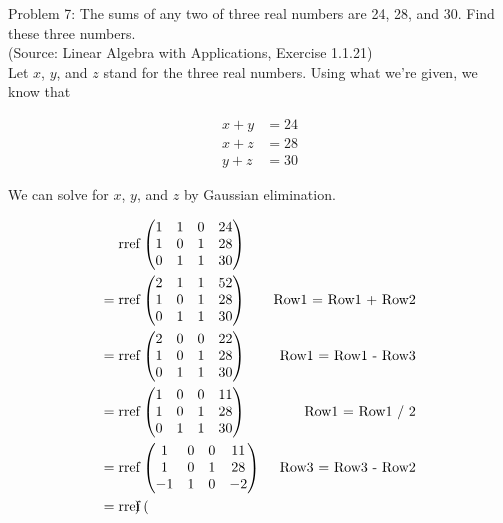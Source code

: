 \documentclass{article}
\begin{document}
Problem 7: The sums of any two of three real numbers are 24, 28, and 30. Find these three numbers. \\

(Source: Linear Algebra with Applications, Exercise 1.1.21) \\

Let $x$, $y$, and $z$ stand for the three real numbers. Using what we're given, we know that

\begin{align*}
x + y &= 24 \\
x + z &= 28 \\
y + z &= 30
\end{align*}

We can solve for $x$, $y$, and $z$ by Gaussian elimination.

\begin{align*}
\mathop{\rm rref} & \begin{pmatrix}
1 & 1 & 0 & 24 \\
1 & 0 & 1 & 28 \\
0 & 1 & 1 & 30
\end{pmatrix} \\
= \mathop{\rm rref} & \begin{pmatrix}
2 & 1 & 1 & 52 \\
1 & 0 & 1 & 28 \\
0 & 1 & 1 & 30
\end{pmatrix} & \text{Row1 = Row1 + Row2} \\
= \mathop{\rm rref} & \begin{pmatrix}
2 & 0 & 0 & 22 \\
1 & 0 & 1 & 28 \\
0 & 1 & 1 & 30
\end{pmatrix} & \text{Row1 = Row1 - Row3} \\
= \mathop{\rm rref} & \begin{pmatrix}
1 & 0 & 0 & 11 \\
1 & 0 & 1 & 28 \\
0 & 1 & 1 & 30
\end{pmatrix} & \text{Row1 = Row1 / 2} \\
= \mathop{\rm rref} & \begin{pmatrix}
1 & 0 & 0 & 11 \\
1 & 0 & 1 & 28 \\
-1 & 1 & 0 & -2
\end{pmatrix} & \text{Row3 = Row3 - Row2} \\
= \mathop{\rm rref} & \begin{pmatrix}

\end{pmatrix}
\end{align*}
\end{document}
